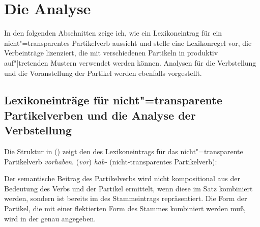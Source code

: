 \section{Die Analyse}
\label{sec-pv-anal}

In den folgenden Abschnitten zeige ich, wie ein Lexikoneintrag
für ein nicht"=transparentes Partikelverb aussieht und stelle
eine Lexikonregel vor, die Verbeinträge lizenziert, die mit verschiedenen
Partikeln in produktiv auf"|tretenden Mustern verwendet werden können.
Analysen für die Verbstellung und die Voranstellung der Partikel
werden ebenfalls vorgestellt.

\subsection{Lexikoneinträge für nicht"=transparente Partikelverben und die Analyse der Verbstellung}
\label{le-nontr-part-verb}

Die Struktur in () zeigt den \locw des Lexikoneintrags für das
nicht"=transparente Partikelverb \emph{vorhaben}.
%
\eas
({\em vor}) {\em hab-\/} (nicht-transparentes Partikelverb):\label{le-vorhaben}
\\
\zs

\noindent
Der semantische Beitrag des Partikelverbs wird nicht kompositional aus der Bedeutung
des Verbs und der Partikel ermittelt, wenn diese im Satz kombiniert werden, sondern
ist bereits im \contw des Stammeintrags repräsentiert. Die Form der Partikel,
die mit einer flektierten Form des Stammes kombiniert werden muß, wird in der
\subcatl genau angegeben.

